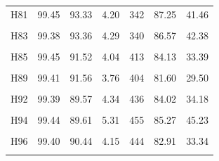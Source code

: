 \documentclass[
  a4paper,
  titlepage]{article}
\begin{document}
\begin{longtable}[t]{lllllll}
H81 & 99.45 & 93.33 & 4.20 & 342 & 87.25 & 41.46\\
 
\cellcolor{gray!6}{H82} & \cellcolor{gray!6}{99.38} & \cellcolor{gray!6}{91.18} & \cellcolor{gray!6}{3.73} & \cellcolor{gray!6}{421} & \cellcolor{gray!6}{82.42} & \cellcolor{gray!6}{29.14}\\
 
H83 & 99.38 & 93.36 & 4.29 & 340 & 86.57 & 42.38\\
 
\cellcolor{gray!6}{H84} & \cellcolor{gray!6}{99.40} & \cellcolor{gray!6}{89.62} & \cellcolor{gray!6}{4.18} & \cellcolor{gray!6}{434} & \cellcolor{gray!6}{83.10} & \cellcolor{gray!6}{32.03}\\
 
H85 & 99.45 & 91.52 & 4.04 & 413 & 84.13 & 33.39\\
 
\cellcolor{gray!6}{H87} & \cellcolor{gray!6}{99.43} & \cellcolor{gray!6}{90.86} & \cellcolor{gray!6}{4.00} & \cellcolor{gray!6}{418} & \cellcolor{gray!6}{82.51} & \cellcolor{gray!6}{31.16}\\
 
H89 & 99.41 & 91.56 & 3.76 & 404 & 81.60 & 29.50\\
 
\cellcolor{gray!6}{H91} & \cellcolor{gray!6}{99.44} & \cellcolor{gray!6}{91.58} & \cellcolor{gray!6}{3.44} & \cellcolor{gray!6}{403} & \cellcolor{gray!6}{80.01} & \cellcolor{gray!6}{24.22}\\
 
H92 & 99.39 & 89.57 & 4.34 & 436 & 84.02 & 34.18\\
 
\cellcolor{gray!6}{H93} & \cellcolor{gray!6}{99.47} & \cellcolor{gray!6}{91.64} & \cellcolor{gray!6}{3.51} & \cellcolor{gray!6}{404} & \cellcolor{gray!6}{80.49} & \cellcolor{gray!6}{25.49}\\
 
H94 & 99.44 & 89.61 & 5.31 & 455 & 85.27 & 45.23\\
 
\cellcolor{gray!6}{H95} & \cellcolor{gray!6}{99.43} & \cellcolor{gray!6}{91.98} & \cellcolor{gray!6}{3.73} & \cellcolor{gray!6}{420} & \cellcolor{gray!6}{83.67} & \cellcolor{gray!6}{30.96}\\
 
H96 & 99.40 & 90.44 & 4.15 & 444 & 82.91 & 33.34\\
 
\cellcolor{gray!6}{H97} & \cellcolor{gray!6}{99.40} & \cellcolor{gray!6}{90.44} & \cellcolor{gray!6}{3.80} & \cellcolor{gray!6}{416} & \cellcolor{gray!6}{80.90} & \cellcolor{gray!6}{27.19}\\
 

\end{longtable}
\end{document}
